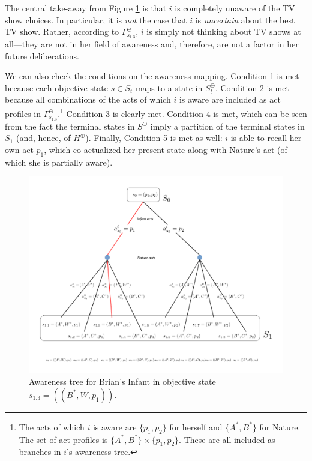 \documentclass[
11pt,
titlepage,
reqno,
]{article}%
\theoremstyle{definition}
\begin{document}
The central take-away from Figure \ref{Diag: p-02} is that $i$ is completely unaware of the TV show choices.
In particular, it is \textit{not} the case that $i$ is \textit{uncertain} about the best TV show.
Rather, according to $\Gamma^\ominus_{s_{1.3}}$, $i$ is simply not thinking about TV shows at all---they are not in her field of awareness and, therefore, are not a factor in her future deliberations.

We can also check the conditions on the awareness mapping. 
Condition 1 is met because each objective state $s\in S_t$ maps to a state in $S^\ominus_t$.
Condition 2 is met because all combinations of the acts of which $i$ is aware are included as act profiles in $\Gamma^\ominus_{s_{1.3}}$.\footnote
{
	The acts of which $i$ is aware are $\{p_1,p_2\}$ for herself and $\{A^\ast,B^\ast\}$ for Nature. The set of act profiles is  $\{A^\ast,B^\ast\}\times \{p_1,p_2\}$. These are all included as branches in $i$'s awareness tree. 
}
Condition 3 is clearly met. 
Condition 4 is met, which can be seen from the fact the terminal states in $S^\ominus$ imply a partition of the terminal states in $S_1$ (and, hence, of $H^\oplus$).
Finally, Condition 5 is met as well: $i$ is able to recall her own act $p_1$, which co-actualized her present state along with Nature's act (of which she is partially aware).

\begin{figure}[h!]
	\centering
	\includegraphics*[page=2,trim = 0in 0in 0in 0in,scale=.6]{Awareness_Diagrams_All}
	\caption{Awareness tree for Brian's Infant in objective state $s_{1.3}=((B^\ast,W,p_1)) $.\label{Diag: p-02}}%
\end{figure}
	
\end{document}
